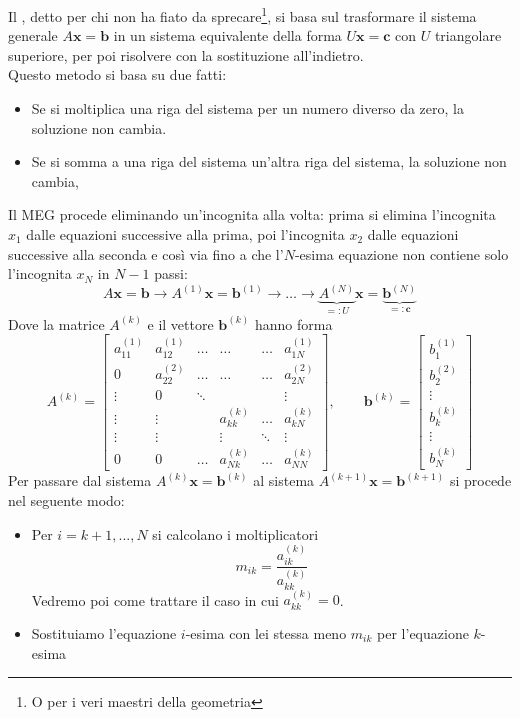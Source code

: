 \documentclass[openany]{book}
\begin{document}
Il , detto  per chi non ha fiato da sprecare\footnote{O  per i veri maestri della geometria}, si basa sul trasformare il sistema generale $A\mathbf{x} = \mathbf{b}$ in un sistema equivalente della forma $U\mathbf x = \mathbf c$ con $U$ triangolare superiore, per poi risolvere con la sostituzione all'indietro.\\
Questo metodo si basa su due fatti:\begin{itemize}
    \item Se si moltiplica una riga del sistema per un numero diverso da zero, la soluzione non cambia.
    \item Se si somma a una riga del sistema un'altra riga del sistema, la soluzione non cambia,
\end{itemize}
Il MEG procede eliminando un'incognita alla volta: prima si elimina l'incognita $x_1$ dalle equazioni successive alla prima, poi l'incognita $x_2$ dalle equazioni successive alla seconda e così via fino a che l'$N$-esima equazione non contiene solo l'incognita $x_N$ in $N-1$ passi:
\[ A\mathbf x = \mathbf b \to A^{(1)}\mathbf x = \mathbf b^{(1)}\to \dots \to \underbrace{A^{(N)}}_{=: U}\mathbf x = \underbrace{\mathbf b^{(N)}}_{=: \mathbf c}  \]
Dove la matrice $A^{(k)}$ e il vettore $\mathbf b^{(k)}$ hanno forma 
\[ A^{(k)} = \begin{bmatrix}
a_{11}^{(1)} & a_{12}^{(1)} & \dots & \dots & \dots & a_{1N}^{(1)} \\
0 & a_{22}^{(2)} & \dots & \dots & \dots & a_{2N}^{(2)} \\
\vdots & 0 & \ddots &  &  & \vdots \\
\vdots & \vdots &  & a_{kk}^{(k)} & \dots & a_{kN}^{(k)} \\
\vdots & \vdots &  & \vdots & \ddots & \vdots \\
0 & 0 & \dots & a_{Nk}^{(k)} & \dots & a_{NN}^{(k)}
\end{bmatrix}, \qquad \mathbf b^{(k)} = \begin{bmatrix}
    b_1^{(1)}\\ b_2^{(2)} \\ \vdots \\ b_k^{(k)} \\ \vdots \\ b_N^{(k)}
\end{bmatrix} \]
Per passare dal sistema $A^{(k)}\mathbf x = \mathbf b^{(k)}$ al sistema $A^{(k+1)}\mathbf x = \mathbf b^{(k+1)}$ si procede nel seguente modo:\begin{itemize}
    \item Per $i = k+1,..., N$ si calcolano i moltiplicatori 
        \[ m_{ik} = \frac{a_{ik}^{(k)}}{a_{kk}^{(k)}} \]
        Vedremo poi come trattare il caso in cui $a_{kk}^{(k)}=0$.
    \item Sostituiamo l'equazione $i$-esima con lei stessa meno $m_{ik}$ per l'equazione $k$-esima
\end{itemize}
\end{document}
